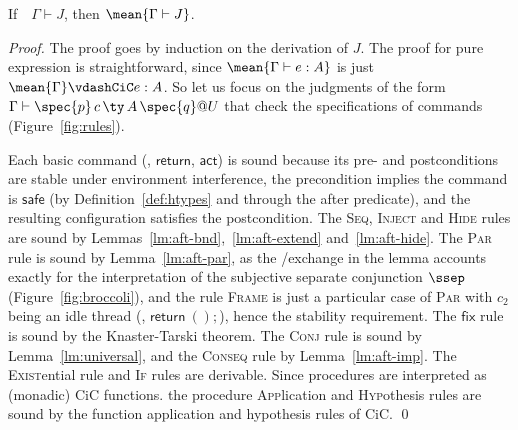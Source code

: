 \begin{theorem}[Soundness]
\label{thm:soundness}
If~~$\Gamma \vdash J$, then $\mean{\Gamma \vdash J}$.
\end{theorem}
\begin{proof}
  The proof goes by induction on the derivation of $J$. The proof for
  pure expression is straightforward, since $\mean{\Gamma \vdash e:
    A}$ is just $\mean{\Gamma} \vdashCiC e: A$. 
  So let us focus on the judgments of the form $\Gamma \vdash
  \spec{p}\,c\, \ty \,A\,\spec{q}@U$ that check the specifications of
  \SCST commands (Figure~\ref{fig:rules}).

  Each basic command (\eg, $\mathsf{return}$, $\mathsf{act}$) is sound
  because its pre- and postconditions are stable under environment
  interference, the precondition implies the command is
  $\mathsf{safe}$ (by Definition~\ref{def:htypes} and through the
  \textsf{after} predicate), and the resulting configuration satisfies
  the postcondition.
  The \textsc{Seq}, \textsc{Inject} and \textsc{Hide} rules are sound by
  Lemmas~\ref{lm:aft-bnd},~\ref{lm:aft-extend} and~\ref{lm:aft-hide}.
  The \textsc{Par} rule is sound by Lemma~\ref{lm:aft-par}, as the
  \self/\other exchange in the lemma accounts exactly for the
  interpretation of the subjective separate conjunction $\ssep$
  (Figure~\ref{fig:broccoli}), and the rule \textsc{Frame} is just a
  particular case of \textsc{Par} with $c_2$ being an idle thread
  (\eg, $\mathsf{return}~();$), hence the stability requirement.
  The $\mathsf{fix}$ rule is sound by the Knaster-Tarski theorem. 
  The \textsc{Conj} rule is sound by Lemma~\ref{lm:universal}, and
  the \textsc{Conseq} rule by Lemma~\ref{lm:aft-imp}. 
  The \textsc{Exist}ential rule and \textsc{If} rules are derivable. 
  Since \SCSL procedures are interpreted as (monadic) CiC functions.
  the procedure \textsc{App}lication and \textsc{Hyp}othesis rules are
  sound by the function application and hypothesis rules of CiC.  
  \qed
\end{proof}
